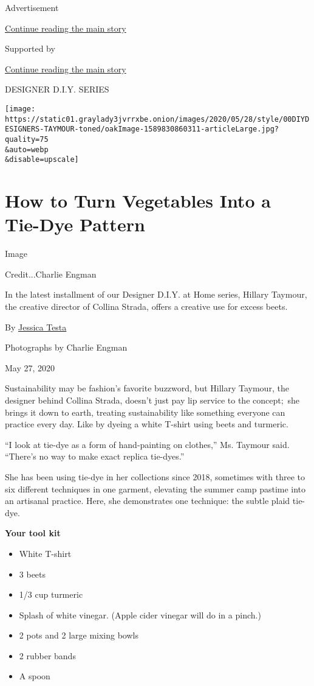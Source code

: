 Advertisement

\protect\hyperlink{after-top}{Continue reading the main story}

Supported by

\protect\hyperlink{after-sponsor}{Continue reading the main story}

DESIGNER D.I.Y. SERIES

\texttt{[image: https://static01.graylady3jvrrxbe.onion/images/2020/05/28/style/00DIYDESIGNERS-TAYMOUR-toned/oakImage-1589830860311-articleLarge.jpg?quality=75\\\&auto=webp\\\&disable=upscale]}

\hypertarget{how-to-turn-vegetables-into-a-tie-dye-pattern}{%
\section{How to Turn Vegetables Into a Tie-Dye
Pattern}\label{how-to-turn-vegetables-into-a-tie-dye-pattern}}

Image

Credit...Charlie Engman

In the latest installment of our Designer D.I.Y. at Home series, Hillary
Taymour, the creative director of Collina Strada, offers a creative use
for excess beets.

By \href{https://www.nytimes3xbfgragh.onion/by/jessica-testa}{Jessica
Testa}

Photographs by Charlie Engman

May 27, 2020

Sustainability may be fashion's favorite buzzword, but Hillary Taymour,
the designer behind Collina Strada, doesn't just pay lip service to the
concept;~she brings it down to earth, treating sustainability like
something everyone can practice every day. Like by dyeing a white
T-shirt using beets and turmeric.

``I look at tie-dye as a form of hand-painting on clothes,'' Ms. Taymour
said. ``There's no way to make exact replica tie-dyes.''

She has been using tie-dye in her collections since 2018, sometimes with
three to six different techniques in one garment, elevating the summer
camp pastime into an artisanal practice. Here, she demonstrates one
technique: the subtle plaid tie-dye.

\textbf{Your tool kit}

\begin{itemize}
\item
  White T-shirt
\item
  3 beets
\item
  1/3 cup turmeric
\item
  Splash of white vinegar. (Apple cider vinegar will do in a pinch.)
\item
  2 pots and 2 large mixing bowls
\item
  2 rubber bands
\item
  A spoon
\end{itemize}

